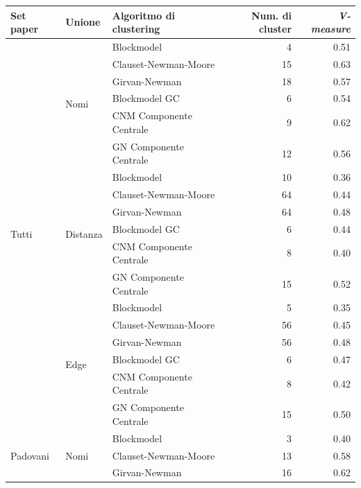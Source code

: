 \documentclass[12pt,a4paper,twoside]{report}
\begin{document}
\clearpage %
{
    \footnotesize
\begin{center}
\label{tab:valorivmeasure}
\begin{longtable}{ |l|l|l|r|r| }
    \hline
        Set paper & Unione & Algoritmo di clustering & Num. di cluster & \textit{V-measure} \\
    \hline
        \multirow{18}{4em}{Tutti}
        &
        \multirow{6}{4em}{Nomi}
        &Blockmodel  &4&0.51\\
        &&Clauset-Newman-Moore&15&0.63\\
        &&Girvan-Newman  &18&0.57\\
        &&Blockmodel GC  &6&0.54\\
        &&CNM Componente Centrale  &9&0.62\\
        &&GN Componente Centrale  &12&0.56\\
    \cline{2-5}
        &
        \multirow{6}{4em}{Distanza}
        &Blockmodel &10&0.36\\
        &&Clauset-Newman-Moore &64&0.44\\
        &&Girvan-Newman &64 &0.48\\
        &&Blockmodel GC  &6&0.44\\
        &&CNM Componente Centrale  &8&0.40\\
        &&GN Componente Centrale  &15&0.52\\
    \cline{2-5}
        &
        \multirow{6}{4em}{Edge}
        &Blockmodel &5&0.35\\
        &&Clauset-Newman-Moore &56&0.45\\
        &&Girvan-Newman &56&0.48\\
        &&Blockmodel GC  &6&0.47\\
        &&CNM Componente Centrale  &8&0.42\\
        &&GN Componente Centrale  &15&0.50\\
    \cline{1-5}
        \multirow{18}{4em}{Padovani}
        &
        \multirow{6}{4em}{Nomi}
        &Blockmodel &3&0.40\\
        &&Clauset-Newman-Moore &13&0.58\\
        &&Girvan-Newman &16&0.62\\

\end{longtable}
\end{center}}
\end{document}
